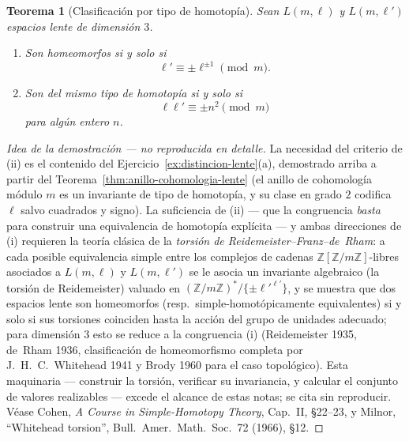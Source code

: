 \documentclass[11pt,a4paper]{article}
\theoremstyle{plain}
\newtheorem{theorem}{Teorema}[section]
\theoremstyle{definition}
\theoremstyle{remark}
\newcommand{\ZZ}{\mathbb Z}
\begin{document}
\begin{theorem}[Clasificación por tipo de homotopía]
\label{thm:clasificacion-lente}
Sean $L(m,\ell)$ y $L(m,\ell')$ espacios lente de dimensión $3$.
\begin{enumerate}[label=(\roman*)]
\item Son homeomorfos si y solo si
\[
\ell'\equiv\pm\ell^{\pm1}\pmod m.
\]
\item Son del mismo tipo de homotopía si y solo si
\[
\ell\ell'\equiv\pm n^2\pmod m
\]
para algún entero $n$.
\end{enumerate}
\end{theorem}

\begin{proof}[Idea de la demostración --- no reproducida en detalle]
La necesidad del criterio de (ii) es el contenido del
Ejercicio~\ref{ex:distincion-lente}(a), demostrado arriba a partir del
Teorema~\ref{thm:anillo-cohomologia-lente} (el anillo de cohomología
módulo $m$ es un invariante de tipo de homotopía, y su clase en grado $2$
codifica $\ell$ salvo cuadrados y signo). La suficiencia de (ii) --- que
la congruencia \emph{basta} para construir una equivalencia de homotopía
explícita --- y ambas direcciones de (i) requieren la teoría clásica de
la \emph{torsión de Reidemeister--Franz--de~Rham}: a cada posible
equivalencia simple entre los complejos de cadenas $\ZZ[\ZZ/m\ZZ]$-libres
asociados a $L(m,\ell)$ y $L(m,\ell')$ se le asocia un invariante
algebraico (la torsión de Reidemeister) valuado en
$(\ZZ/m\ZZ)^*/\{\pm\ell'^{\ell'}\}$, y se muestra que dos espacios lente
son homeomorfos (resp.\ simple-homotópicamente equivalentes) si y solo si
sus torsiones coinciden hasta la acción del grupo de unidades adecuado;
para dimensión $3$ esto se reduce a la congruencia (i) (Reidemeister
1935, de~Rham 1936, clasificación de homeomorfismo completa por
J.~H.~C.~Whitehead 1941 y Brody 1960 para el caso topológico). Esta
maquinaria --- construir la torsión, verificar su invariancia, y calcular
el conjunto de valores realizables --- excede el alcance de estas notas;
se cita sin reproducir. Véase Cohen, \emph{A Course in Simple-Homotopy
Theory}, Cap.~II, \S 22--23, y Milnor, ``Whitehead torsion'', Bull.\
Amer.\ Math.\ Soc.\ 72 (1966), \S 12.
\end{proof}
\end{document}
